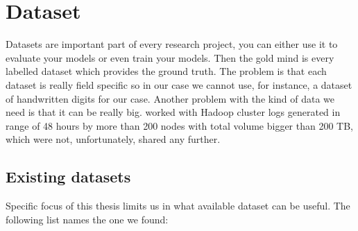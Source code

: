 \chapter{Dataset}
\label{chap:dataset}

Datasets are important part of every research project, you can either use it to evaluate your models or even train your models. Then the gold mind is every labelled dataset which provides the ground truth. The problem is that each dataset is really field specific so in our case we cannot use, for instance, a dataset of handwritten digits for our case. Another problem with the kind of data we need is that it can be really big. \cite{xu2009detecting} worked with Hadoop cluster logs generated in range of 48 hours by more than 200 nodes with total volume bigger than 200 TB, which were not, unfortunately, shared any further.

\section{Existing datasets}

Specific focus of this thesis limits us in what available dataset can be useful. The following list names the one we found:

